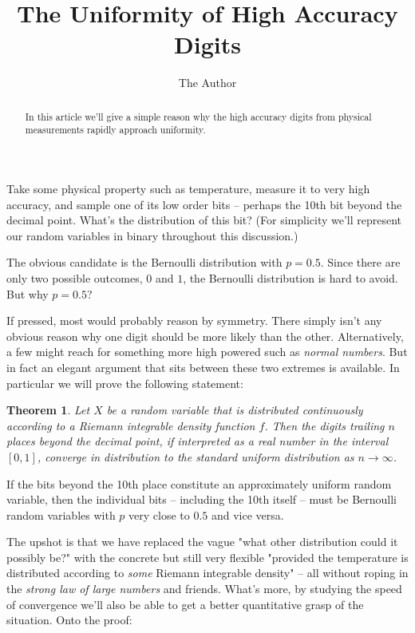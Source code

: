 \documentclass{article}
\theoremstyle{theorem}
\newtheorem{theorem}{Theorem}
\theoremstyle{definition}
\begin{document}
\title{The Uniformity of High Accuracy Digits}
\author{The Author}

\maketitle

\begin{abstract}
In this article we'll give a simple reason why the high accuracy digits from physical measurements rapidly approach uniformity.
\end{abstract}


\noindent
Take some physical property such as temperature, measure it to very high accuracy, and sample one of its low order bits -- perhaps the 10th bit beyond the decimal point. What's the distribution of this bit? (For simplicity we'll represent our random variables in binary throughout this discussion.)

The obvious candidate is the Bernoulli distribution with $p=0.5$. Since there are only two possible outcomes, $0$ and $1$, the Bernoulli distribution is hard to avoid. But why $p=0.5$?

If pressed, most would probably reason by symmetry. There simply isn't any obvious reason why one digit should be more likely than the other. Alternatively, a few might reach for something more high powered such as \textit{normal numbers}. But in fact an elegant argument that sits between these two extremes is available. In particular we will prove the following statement:

\begin{theorem}
Let $X$ be a random variable that is distributed continuously according to a Riemann integrable density function $f$. Then the digits trailing $n$ places beyond the decimal point, if interpreted as a real number in the interval $[0,1]$, converge in distribution to the standard uniform distribution as $n\to\infty$.
\end{theorem}

If the bits beyond the 10th place constitute an approximately uniform random variable, then the individual bits -- including the 10th itself -- must be Bernoulli random variables with $p$ very close to $0.5$ and vice versa.

The upshot is that we have replaced the vague "what other distribution could it possibly be?" with the concrete but still very flexible "provided the temperature is distributed according to \textit{some} Riemann integrable density" -- all without roping in the \textit{strong law of large numbers} and friends. What's more, by studying the speed of convergence we'll also be able to get a better quantitative grasp of the situation. Onto the proof:
\end{document}
